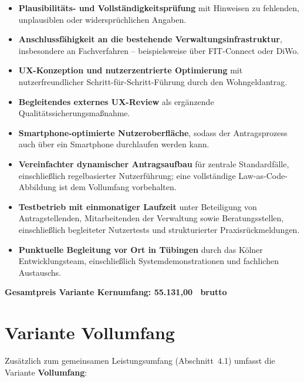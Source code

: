 \begin{itemize}
  \item \textbf{Plausibilitäts- und Vollständigkeitsprüfung} mit Hinweisen zu fehlenden, unplausiblen oder widersprüchlichen Angaben.
  \item \textbf{Anschlussfähigkeit an die bestehende Verwaltungsinfrastruktur}, insbesondere an Fachverfahren -- beispielsweise über FIT-Connect oder DiWo.
  \item \textbf{UX-Konzeption und nutzerzentrierte Optimierung} mit nutzerfreundlicher Schritt-für-Schritt-Führung durch den Wohngeldantrag.
  \item \textbf{Begleitendes externes UX-Review} als ergänzende Qualitätssicherungsmaßnahme.
  \item \textbf{Smartphone-optimierte Nutzeroberfläche}, sodass der Antragsprozess auch über ein Smartphone durchlaufen werden kann.
  \item \textbf{Vereinfachter dynamischer Antragsaufbau} für zentrale Standardfälle, einschließlich regelbasierter Nutzerführung; eine vollständige Law-as-Code-Abbildung ist dem Vollumfang vorbehalten.
  \item \textbf{Testbetrieb mit einmonatiger Laufzeit} unter Beteiligung von Antragstellenden, Mitarbeitenden der Verwaltung sowie Beratungsstellen, einschließlich begleiteter Nutzertests und strukturierter Praxisrückmeldungen.
  \item \textbf{Punktuelle Begleitung vor Ort in Tübingen} durch das Kölner Entwicklungsteam, einschließlich Systemdemonstrationen und fachlichen Austauschs.
\end{itemize}

\medskip
\noindent\textbf{Gesamtpreis Variante Kernumfang: 55.131{,}00~\texteuro{} brutto}

\section{Variante Vollumfang}

Zusätzlich zum gemeinsamen Leistungsumfang (Abschnitt~4.1) umfasst die Variante \textbf{Vollumfang}:

